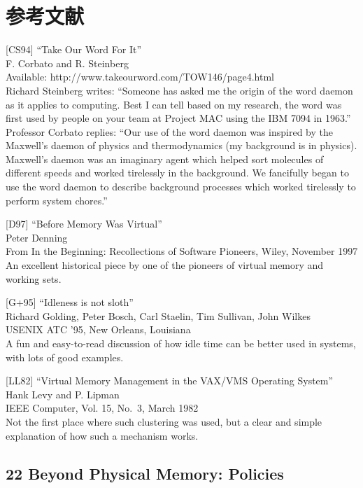 \hypertarget{ux53c2ux8003ux6587ux732e-13}{%
\section*{参考文献}\label{ux53c2ux8003ux6587ux732e-13}}

{[}CS94{]} ``Take Our Word For It''\\
F. Corbato and R. Steinberg\\
Available: http://www.takeourword.com/TOW146/page4.html\\
Richard Steinberg writes: ``Someone has asked me the origin of the word
daemon as it applies to computing. Best I can tell based on my research,
the word was first used by people on your team at Project MAC using the
IBM 7094 in 1963.'' Professor Corbato replies: ``Our use of the word
daemon was inspired by the Maxwell's daemon of physics and
thermodynamics (my background is in physics). Maxwell's daemon was an
imaginary agent which helped sort molecules of different speeds and
worked tirelessly in the background. We fancifully began to use the word
daemon to describe background processes which worked tirelessly to
perform system chores.''

{[}D97{]} ``Before Memory Was Virtual''\\
Peter Denning\\
From In the Beginning: Recollections of Software Pioneers, Wiley,
November 1997\\
An excellent historical piece by one of the pioneers of virtual memory
and working sets.

{[}G+95{]} ``Idleness is not sloth''\\
Richard Golding, Peter Bosch, Carl Staelin, Tim Sullivan, John Wilkes\\
USENIX ATC '95, New Orleans, Louisiana\\
A fun and easy-to-read discussion of how idle time can be better used in
systems, with lots of good examples.

{[}LL82{]} ``Virtual Memory Management in the VAX/VMS Operating
System''\\
Hank Levy and P. Lipman\\
IEEE Computer, Vol. 15, No.~3, March 1982\\
Not the first place where such clustering was used, but a clear and
simple explanation of how such a mechanism works.

\hypertarget{beyond-physical-memory-policies}{%
\subsection*{22 Beyond Physical Memory:
Policies}\label{beyond-physical-memory-policies}}

